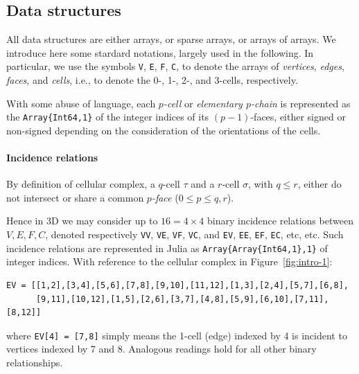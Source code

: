 \begin{example}
\end{example}



\subsection{Data structures}

\label{sec:data} All data structures are either arrays, or sparse arrays, or arrays of arrays. We introduce here some stardard notations, largely used in the following. In particular, we use the symbols \texttt{V}, \texttt{E}, \texttt{F}, \texttt{C}, to denote the arrays of \emph{vertices}, \emph{edges}, \emph{faces}, and \emph{cells},  i.e., to denote the 0-, 1-, 2-, and 3-cells, respectively. 

With some abuse of language, each \emph{$p$-cell} or \emph{elementary $p$-chain} is represented as the \texttt{Array\{Int64,1\}} of the integer indices of its $(p-1)$-faces, either signed or non-signed depending on the consideration of the orientations of the cells.


\paragraph{Incidence relations}

By definition of cellular complex, a $q$-cell $\tau$ and a $r$-cell $\sigma$, with $q\leq r$, either do not intersect or share a common \emph{$p$-face} ($0\leq p\leq q,r$).

Hence in 3D we may consider up to $16=4\times 4$ binary incidence relations between $V,E,F,C$, denoted respectively \texttt{VV}, \texttt{VE}, \texttt{VF}, \texttt{VC}, and
\texttt{EV}, \texttt{EE}, \texttt{EF}, \texttt{EC}, etc, etc.  Such incidence relations are represented in Julia as \texttt{Array\{Array\{Int64,1\},1\}} of integer indices. With reference to the cellular complex in Figure~\ref{fig:intro-1}:

{\small\begin{verbatim}
EV = [[1,2],[3,4],[5,6],[7,8],[9,10],[11,12],[1,3],[2,4],[5,7],[6,8],
      [9,11],[10,12],[1,5],[2,6],[3,7],[4,8],[5,9],[6,10],[7,11],[8,12]]
\end{verbatim}}
\noindent where \texttt{EV[4] = [7,8]} simply means the 1-cell (edge) indexed by 4 is incident to vertices indexed by 7 and 8. Analogous readings hold for all other binary relationships.



